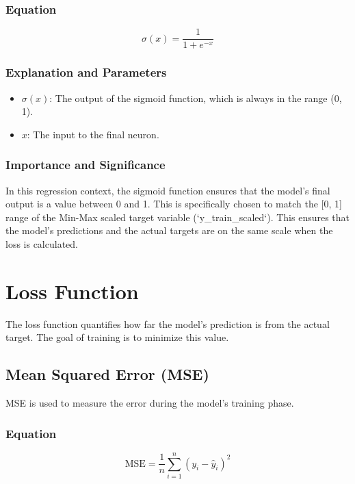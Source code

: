 \documentclass[12pt, a4paper]{article}
\begin{document}
\subsubsection{Equation}
\begin{equation}
\sigma(x) = \frac{1}{1 + e^{-x}}
\end{equation}

\subsubsection{Explanation and Parameters}
\begin{itemize}
    \item \textbf{$\sigma(x)$}: The output of the sigmoid function, which is always in the range (0, 1).
    \item \textbf{$x$}: The input to the final neuron.
\end{itemize}

\subsubsection{Importance and Significance}
In this regression context, the sigmoid function ensures that the model's final output is a value between 0 and 1. This is specifically chosen to match the [0, 1] range of the Min-Max scaled target variable (`y\_train\_scaled`). This ensures that the model's predictions and the actual targets are on the same scale when the loss is calculated.

\newpage
\section{Loss Function}
The loss function quantifies how far the model's prediction is from the actual target. The goal of training is to minimize this value.

\subsection{Mean Squared Error (MSE)}
MSE is used to measure the error during the model's training phase.

\subsubsection{Equation}
\begin{equation}
\text{MSE} = \frac{1}{n} \sum_{i=1}^{n} (y_i - \hat{y}_i)^2
\label{eq:mse}
\end{equation}
\end{document}
